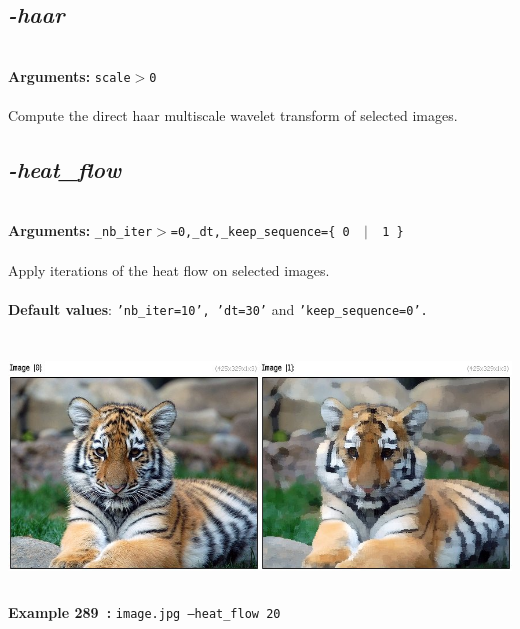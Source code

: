 \documentclass[a4paper,11pt,twoside]{book}
\begin{document}
\subsection{\emph{-haar} }\vspace*{-0.5em}
~\\\textbf{Arguments: } 
{\small \texttt{scale$>$0}}\\~\\
Compute the direct haar multiscale wavelet transform of selected images.


\subsection{\emph{-heat\_flow} }\vspace*{-0.5em}
~\\\textbf{Arguments: } 
{\small \texttt{\_nb\_iter$>$=0,\_dt,\_keep\_sequence=\{ 0 ~$|$~ 1 \}}}\\~\\
Apply iterations of the heat flow on selected images.
~\\~\\\textbf{Default values}: {\small \texttt{'nb\_iter=10', 'dt=30'} and \texttt{'keep\_sequence=0'.}}
\begin{center}\includegraphics[keepaspectratio=true,height=7cm,width=\textwidth]{img/gmic_def289.jpg}\\
{\footnotesize \textbf{Example 289~:} \texttt{image.jpg --heat\_flow 20}}
\end{center}
\end{document}
